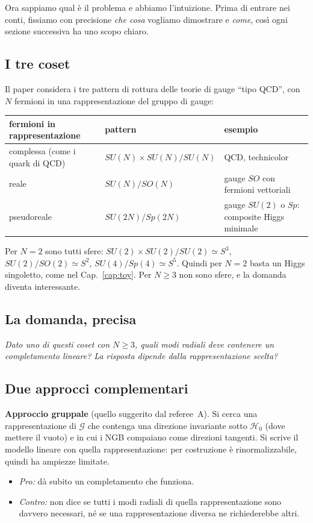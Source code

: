 \documentclass[11pt,a4paper]{article}
\numberwithin{equation}{section}
\theoremstyle{remark}
\newcommand{\G}{\mathcal{G}}
\newcommand{\Hg}{\mathcal{H}_0}
\begin{document}
\begin{dove}
Ora sappiamo qual è il problema e abbiamo l'intuizione. Prima di entrare nei conti, fissiamo con precisione \emph{che cosa} vogliamo dimostrare e \emph{come}, così ogni sezione successiva ha uno scopo chiaro.
\end{dove}

\subsection{I tre coset}

Il paper considera i tre pattern di rottura delle teorie di gauge ``tipo QCD'', con $N$ fermioni in una rappresentazione del gruppo di gauge:
\begin{center}
\begin{tabular}{p{}p{}p{}}
\hline
fermioni in rappresentazione & pattern & esempio\\
\hline
complessa (come i quark di QCD) & $SU(N)\times SU(N)/SU(N)$ & QCD, technicolor\\
reale & $SU(N)/SO(N)$ & gauge $SO$ con fermioni vettoriali\\
pseudoreale & $SU(2N)/Sp(2N)$ & gauge $SU(2)$ o $Sp$: composite Higgs minimale\\
\hline
\end{tabular}
\end{center}
Per $N=2$ sono tutti sfere: $SU(2)\times SU(2)/SU(2)\simeq S^3$, $SU(2)/SO(2)\simeq S^2$, $SU(4)/Sp(4)\simeq S^5$. Quindi per $N=2$ basta un Higgs singoletto, come nel Cap.~\ref{cap:toy}. Per $N\ge3$ non sono sfere, e la domanda diventa interessante.

\subsection{La domanda, precisa}

\emph{Dato uno di questi coset con $N\ge3$, quali modi radiali deve contenere un completamento lineare? La risposta dipende dalla rappresentazione scelta?}

\subsection{Due approcci complementari}

\textbf{Approccio gruppale} (quello suggerito dal referee~A). Si cerca una rappresentazione di $\G$ che contenga una direzione invariante sotto $\Hg$ (dove mettere il vuoto) e in cui i NGB compaiano come direzioni tangenti. Si scrive il modello lineare con quella rappresentazione: per costruzione è rinormalizzabile, quindi ha ampiezze limitate.
\begin{itemize}[nosep]
\item \emph{Pro:} dà subito un completamento che funziona.
\item \emph{Contro:} non dice se tutti i modi radiali di quella rappresentazione sono davvero necessari, né se una rappresentazione diversa ne richiederebbe altri.
\end{itemize}
\end{document}
